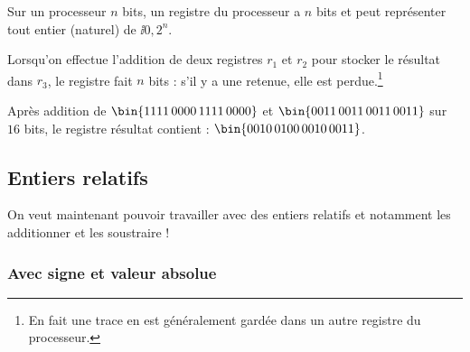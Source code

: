 Sur un processeur $n$ bits, un registre du processeur a $n$ bits et peut
  représenter tout entier (naturel) de $\ii{0,2^{n}}$.

 Lorsqu'on effectue l'addition de deux registres $r_{1}$ et
  $r_{2}$ pour stocker le résultat dans $r_{3}$, le registre fait $n$
  bits : s'il y a une retenue, elle est perdue.\footnote{En fait une
    trace en est généralement gardée dans un autre registre du
    processeur.}

\begin{exemple}
  Après addition de $\bin{1111\,0000\,1111\,0000}$ et
  $\bin{0011\,0011\,0011\,0011}$ sur $16$ bits, le registre résultat contient :
  $\bin{0010\,0100\,0010\,0011}$.
\end{exemple}
   
\subsection{Entiers relatifs}

On veut maintenant pouvoir travailler avec des entiers relatifs et notamment les additionner et les soustraire !

\subsubsection{Avec signe et valeur absolue}


